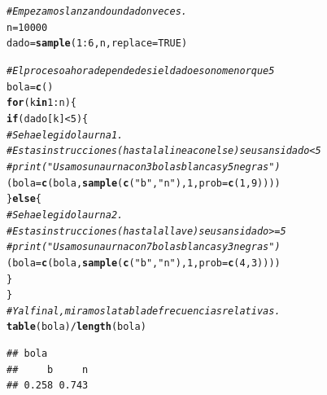 \documentclass[10pt,a4paper]{article}\usepackage[]{graphicx}\usepackage[]{color}
\makeatletter
\newcommand{\hlnum}[1]{\textcolor[rgb]{0.686,0.059,0.569}{#1}}%
\newcommand{\hlstr}[1]{\textcolor[rgb]{0.192,0.494,0.8}{#1}}%
\newcommand{\hlcom}[1]{\textcolor[rgb]{0.678,0.584,0.686}{\textit{#1}}}%
\newcommand{\hlopt}[1]{\textcolor[rgb]{0,0,0}{#1}}%
\newcommand{\hlstd}[1]{\textcolor[rgb]{0.345,0.345,0.345}{#1}}%
\newcommand{\hlkwa}[1]{\textcolor[rgb]{0.161,0.373,0.58}{\textbf{#1}}}%
\newcommand{\hlkwb}[1]{\textcolor[rgb]{0.69,0.353,0.396}{#1}}%
\newcommand{\hlkwc}[1]{\textcolor[rgb]{0.333,0.667,0.333}{#1}}%
\newcommand{\hlkwd}[1]{\textcolor[rgb]{0.737,0.353,0.396}{\textbf{#1}}}%
\newenvironment{kframe}{%
 \def\at@end@of@kframe{}%
 \ifinner\ifhmode%
  \def\at@end@of@kframe{\end{minipage}}%
  \begin{minipage}{\columnwidth}%
 \fi\fi%
 \def\FrameCommand##1{\hskip\@totalleftmargin \hskip-\fboxsep
 \colorbox{shadecolor}{##1}\hskip-\fboxsep
     \hskip-\linewidth \hskip-\@totalleftmargin \hskip\columnwidth}%
 \MakeFramed {\advance\hsize-\width
   \@totalleftmargin\z@ \linewidth\hsize
   \@setminipage}}%
 {\par\unskip\endMakeFramed%
 \at@end@of@kframe}
\newenvironment{knitrout}{}{} %
\makeatother
\begin{document}
\begin{knitrout}
\color{fgcolor}\begin{kframe}
\begin{alltt}
\hlcom{# Empezamos lanzando un dado n veces.}
\hlstd{n} \hlkwb{=} \hlnum{10000}
\hlstd{dado} \hlkwb{=} \hlkwd{sample}\hlstd{(}\hlnum{1}\hlopt{:}\hlnum{6}\hlstd{, n,} \hlkwc{replace}\hlstd{=}\hlnum{TRUE}\hlstd{)}

\hlcom{# El proceso ahora depende de si el dado es o no menor que 5}
\hlstd{bola}\hlkwb{=}\hlkwd{c}\hlstd{()}
\hlkwa{for}\hlstd{(k} \hlkwa{in} \hlnum{1}\hlopt{:}\hlstd{n)\{}
  \hlkwa{if}\hlstd{(dado[k]} \hlopt{<} \hlnum{5}\hlstd{)\{}
      \hlcom{#Se ha elegido la urna 1.}
      \hlcom{#Estas instrucciones (hasta la linea con else) se usan si dado<5}
      \hlcom{#print("Usamos una urna con 3 bolas blancas y 5 negras")}
      \hlstd{(bola} \hlkwb{=} \hlkwd{c}\hlstd{(bola,} \hlkwd{sample}\hlstd{(}\hlkwd{c}\hlstd{(}\hlstr{"b"}\hlstd{,}\hlstr{"n"}\hlstd{),} \hlnum{1}\hlstd{,} \hlkwc{prob}\hlstd{=}\hlkwd{c}\hlstd{(}\hlnum{1}\hlstd{,}\hlnum{9}\hlstd{)) ) )}
  \hlstd{\}}\hlkwa{else}\hlstd{\{}
    \hlcom{#Se ha elegido la urna 2.}
    \hlcom{#Estas instrucciones (hasta la llave) se usan si dado>=5}
    \hlcom{#print("Usamos una urna con 7 bolas blancas y 3 negras")}
      \hlstd{(bola} \hlkwb{=} \hlkwd{c}\hlstd{(bola,} \hlkwd{sample}\hlstd{(}\hlkwd{c}\hlstd{(}\hlstr{"b"}\hlstd{,}\hlstr{"n"}\hlstd{),} \hlnum{1}\hlstd{,} \hlkwc{prob}\hlstd{=}\hlkwd{c}\hlstd{(}\hlnum{4}\hlstd{,}\hlnum{3}\hlstd{)) ) )}
  \hlstd{\}}
\hlstd{\}}
\hlcom{# Y al final, miramos la tabla de frecuencias relativas.}
\hlkwd{table}\hlstd{(bola)} \hlopt{/} \hlkwd{length}\hlstd{(bola)}
\end{alltt}
\begin{verbatim}
## bola
##     b     n 
## 0.258 0.743
\end{verbatim}
\end{kframe}
\end{knitrout}
\end{document}
